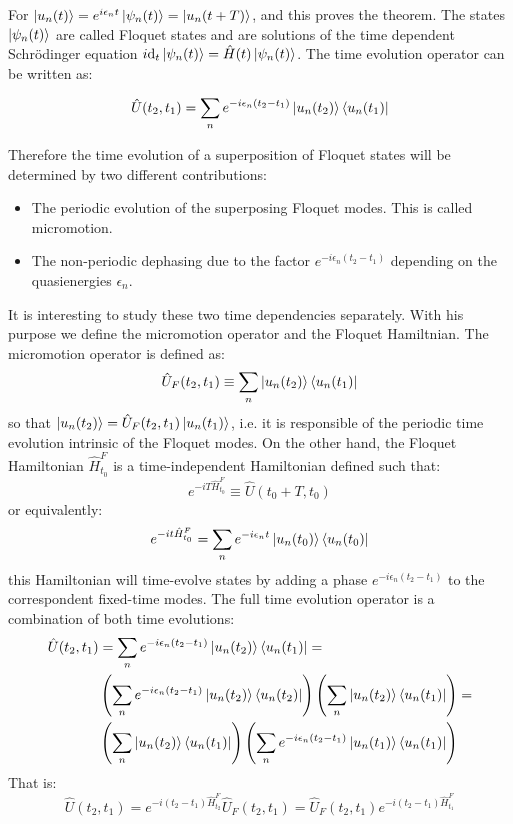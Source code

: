 For $\ket{u_n(t)} = e^{i\epsilon_nt} \ket{\psi_n(t)} = \ket{u_n(t+T)}$, and this proves the theorem. The states $\ket{\psi_n(t)}$ are called Floquet states and are solutions of the time dependent Schr\"{o}dinger equation $i\text{d}_t\ket{\psi_n(t)} = \hat{H}(t)\ket{\psi_n(t)}$. The time evolution operator can be written as:

\begin{equation}
\hat{U}(t_2,t_1) = \sum_n e^{-i\epsilon_n(t_2-t_1)}\ket{u_n(t_2)}\bra{u_n(t_1)}
\end{equation}

Therefore the time evolution of a superposition of Floquet states will be determined by two different contributions:

\begin{itemize}
\item The periodic evolution of the superposing Floquet modes. This is called micromotion.
\item The non-periodic dephasing due to the factor $e^{-i\epsilon_n(t_2-t_1)}$ depending on the quasienergies $\epsilon_n$.
\end{itemize} 

It is interesting to study these two time dependencies separately. With his purpose we define the micromotion operator and the Floquet Hamiltnian. The micromotion operator is defined as:
\begin{equation}
\hat{U}_F(t_2,t_1) \equiv \sum_n \ket{u_n(t_2)}\bra{u_n(t_1)}
\end{equation}
so that $\ket{u_n(t_2)} = \hat{U}_F(t_2,t_1)\ket{u_n(t_1)}$, i.e. it is responsible of the periodic time evolution intrinsic of the Floquet modes. On the other hand, the Floquet Hamiltonian $\hat{H}_{t_0}^F$ is a time-independent Hamiltonian defined such that:
\begin{equation}
e^{-iT\hat{H}_{t_0}^F} \equiv \hat{U}(t_0+T,t_0)
\end{equation}
or equivalently:
\begin{equation}
e^{-it\hat{H}_{t_0}^F} = \sum_n e^{-i\epsilon_nt}\ket{u_n(t_0)}\bra{u_n(t_0)}
\end{equation}
this Hamiltonian will time-evolve states by adding a phase $e^{-i\epsilon_n(t_2-t_1)}$ to the correspondent fixed-time modes. The full time evolution operator is a combination of both time evolutions:
\begin{align*}
\hat{U}(t_2,t_1) &= \sum_n e^{-i\epsilon_n(t_2-t_1)}\ket{u_n(t_2)}\bra{u_n(t_1)} = \\
&\left( \sum_n e^{-i\epsilon_n(t_2-t_1)}\ket{u_n(t_2)}\bra{u_n(t_2)} \right)\left( \sum_n\ket{u_n(t_2)}\bra{u_n(t_1)}\right) = \\
&\left( \sum_n \ket{u_n(t_2)}\bra{u_n(t_1)} \right)\left( \sum_n e^{-i\epsilon_n(t_2-t_1)}\ket{u_n(t_1)}\bra{u_n(t_1)} \right)
\end{align*}
That is:
\begin{equation}
\hat{U}(t_2,t_1) = e^{-i(t_2-t_1)\hat{H}_{t_2}^F}\hat{U}_F(t_2,t_1) = \hat{U}_F(t_2,t_1)e^{-i(t_2-t_1)\hat{H}_{t_1}^F}
\end{equation}

